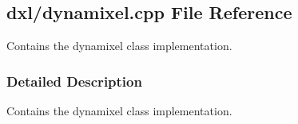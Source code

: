 \hypertarget{a00014}{}\subsection{dxl/dynamixel.cpp File Reference}
\label{a00014}


Contains the dynamixel class implementation.  




\subsubsection{Detailed Description}
Contains the dynamixel class implementation. 


